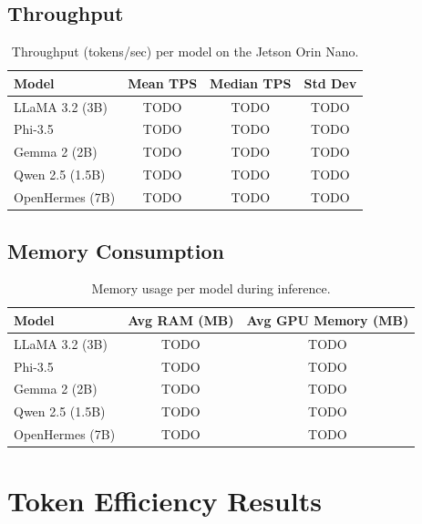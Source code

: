 \documentclass[12pt,a4paper,oneside]{report}
\begin{document}

\subsection{Throughput}

\begin{table}[htbp]
\caption{Throughput (tokens/sec) per model on the Jetson Orin Nano.}
\label{tab:llm-throughput}
\centering
\begin{tabular}{lccc}
\toprule
\textbf{Model} & \textbf{Mean TPS} & \textbf{Median TPS} & \textbf{Std Dev} \\
\midrule
LLaMA 3.2 (3B)   & TODO & TODO & TODO \\
Phi-3.5           & TODO & TODO & TODO \\
Gemma 2 (2B)      & TODO & TODO & TODO \\
Qwen 2.5 (1.5B)   & TODO & TODO & TODO \\
OpenHermes (7B)   & TODO & TODO & TODO \\
\bottomrule
\end{tabular}
\end{table}


\subsection{Memory Consumption}

\begin{table}[htbp]
\caption{Memory usage per model during inference.}
\label{tab:llm-memory}
\centering
\begin{tabular}{lcc}
\toprule
\textbf{Model} & \textbf{Avg RAM (MB)} & \textbf{Avg GPU Memory (MB)} \\
\midrule
LLaMA 3.2 (3B)   & TODO & TODO \\
Phi-3.5           & TODO & TODO \\
Gemma 2 (2B)      & TODO & TODO \\
Qwen 2.5 (1.5B)   & TODO & TODO \\
OpenHermes (7B)   & TODO & TODO \\
\bottomrule
\end{tabular}
\end{table}



\section{Token Efficiency Results}
\label{sec:res-efficiency}
\end{document}
